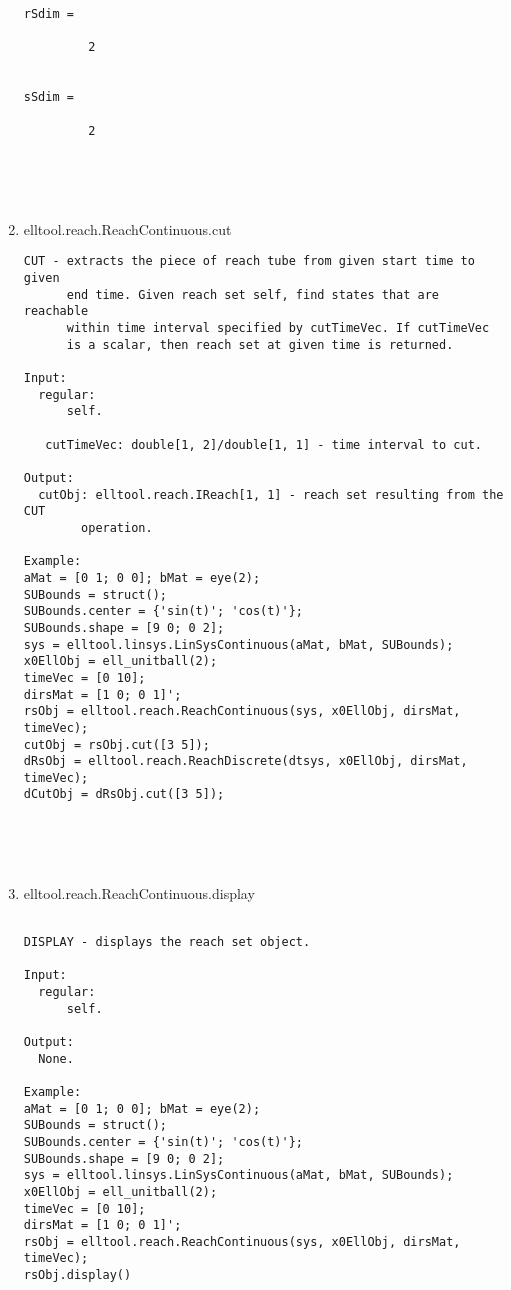 \begin{enumerate}
\begin{lstlisting}
rSdim =

         2


sSdim =

         2





\end{lstlisting}
\fontfamily{\familydefault}
\selectfont
\item {elltool.reach.ReachContinuous.cut}
\selectfont
\begin{lstlisting}
CUT - extracts the piece of reach tube from given start time to given
      end time. Given reach set self, find states that are reachable
      within time interval specified by cutTimeVec. If cutTimeVec
      is a scalar, then reach set at given time is returned.

Input:
  regular:
      self.

   cutTimeVec: double[1, 2]/double[1, 1] - time interval to cut.

Output:
  cutObj: elltool.reach.IReach[1, 1] - reach set resulting from the CUT
        operation.

Example:
aMat = [0 1; 0 0]; bMat = eye(2);
SUBounds = struct();
SUBounds.center = {'sin(t)'; 'cos(t)'};
SUBounds.shape = [9 0; 0 2];
sys = elltool.linsys.LinSysContinuous(aMat, bMat, SUBounds);
x0EllObj = ell_unitball(2);
timeVec = [0 10];
dirsMat = [1 0; 0 1]';
rsObj = elltool.reach.ReachContinuous(sys, x0EllObj, dirsMat, timeVec);
cutObj = rsObj.cut([3 5]);
dRsObj = elltool.reach.ReachDiscrete(dtsys, x0EllObj, dirsMat, timeVec);
dCutObj = dRsObj.cut([3 5]);





\end{lstlisting}
\fontfamily{\familydefault}
\selectfont
\item {elltool.reach.ReachContinuous.display}
\selectfont
\begin{lstlisting}

DISPLAY - displays the reach set object.

Input:
  regular:
      self.

Output:
  None.

Example:
aMat = [0 1; 0 0]; bMat = eye(2);
SUBounds = struct();
SUBounds.center = {'sin(t)'; 'cos(t)'};
SUBounds.shape = [9 0; 0 2];
sys = elltool.linsys.LinSysContinuous(aMat, bMat, SUBounds);
x0EllObj = ell_unitball(2);
timeVec = [0 10];
dirsMat = [1 0; 0 1]';
rsObj = elltool.reach.ReachContinuous(sys, x0EllObj, dirsMat, timeVec);
rsObj.display()


\end{lstlisting}
\end{enumerate}
